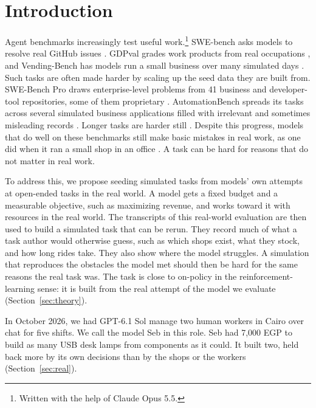 \documentclass[10pt]{article}
\begin{document}
\section{Introduction}
\label{sec:intro}


Agent benchmarks increasingly test useful work.\footnote{Written with the help of Claude Opus 5.5.} SWE-bench asks models to resolve real GitHub issues \citep{jimenez2024swebench}.
GDPval grades work products from real occupations \citep{patwardhan2025gdpval}, and Vending-Bench has models run a small business over many simulated days
\citep{backlund2025vending}. Such tasks are often made harder by scaling up the seed data they are built from. SWE-Bench Pro draws enterprise-level problems from 41 business and developer-tool repositories, some of them proprietary \citep{deng2025swebenchpro}. AutomationBench spreads its tasks across several simulated business applications filled with irrelevant and sometimes misleading records \citep{shepard2026automationbench}. Longer tasks are harder still \citep{kwa2025horizons}. Despite this progress, models that do well on these benchmarks still make basic mistakes in real work, as one did when it ran a small shop in an office \citep{anthropic2025vend}. A task can be hard for reasons that do not matter in real work.

To address this, we propose seeding simulated tasks from models' own attempts at open-ended tasks in the real world. A model gets a fixed budget and a measurable objective, such as maximizing revenue, and works toward it with resources in the real world. The transcripts of this real-world evaluation are then used to build a simulated task that can be rerun. They record much of what a task author would otherwise guess, such as which shops exist, what they stock, and how long rides take. They also show where the model struggles. A simulation that reproduces the obstacles the model met should then be hard for the same reasons the real task was. The task is close to on-policy in the reinforcement-learning sense: it is built from the real attempt of the model we evaluate (Section~\ref{sec:theory}).

In October 2026, we had GPT-6.1 Sol manage two human workers in Cairo over chat for five shifts. We call the model Seb in this role. Seb had 7,000 EGP to build as many USB desk lamps from components as it could. It built two, held back more by its own decisions than by the shops or the workers (Section~\ref{sec:real}).
\end{document}
